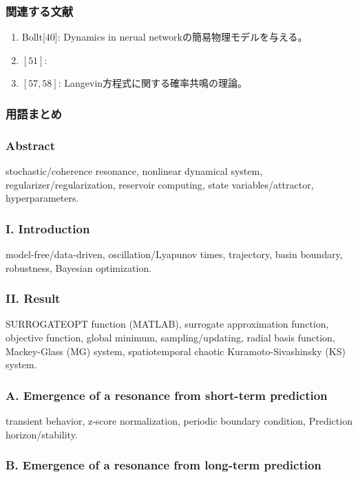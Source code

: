 \subsubsection{関連する文献}
\begin{enumerate}
  \item Bollt[40]: Dynamics in nerual networkの簡易物理モデルを与える。
  \item $[51]$:
  \item $[57, 58]$: Langevin方程式に関する確率共鳴の理論。
\end{enumerate}

\subsubsection{用語まとめ}

\subsubsection{Abstract}
stochastic/coherence resonance, nonlinear dynamical system, regularizer/regularization, reservoir computing, state variables/attractor, hyperparameters.

\subsubsection{I. Introduction}

model-free/data-driven, oscillation/Lyapunov times, trajectory, basin boundary, robustness, Bayesian optimization.

\subsubsection{II. Result}

SURROGATEOPT function (MATLAB), surrogate approximation function, objective function, global minimum, sampling/updating, radial basis function, Mackey-Glass (MG) system, spatiotemporal chaotic Kuramoto-Sivashinsky (KS) system.

\subsubsection{A. Emergence of a resonance from short-term prediction}

transient behavior, z-score normalization, periodic boundary condition, Prediction horizon/stability.

\subsubsection{B. Emergence of a resonance from long-term prediction}

